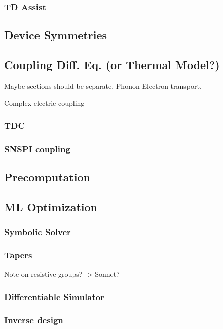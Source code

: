 \documentclass{article}
\begin{document}
\subsubsection{TD Assist}

\subsection{Device Symmetries}

\subsection{Coupling Diff. Eq. (or Thermal Model?)}

Maybe sections should be separate. Phonon-Electron transport.

Complex electric coupling

\subsubsection{TDC}

\subsubsection{SNSPI coupling}

\subsection{Precomputation}

\subsection{ML Optimization}

\subsubsection{Symbolic Solver}

\subsubsection{Tapers}

Note on resistive groups? -> Sonnet?

\subsubsection{Differentiable Simulator}

\subsubsection{Inverse design}
\end{document}

